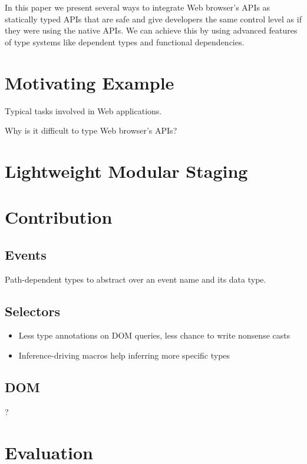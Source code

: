 \documentclass[runningheads,a4paper]{llncs}
\begin{document}
In this paper we present several ways to integrate Web browser’s APIs as statically typed APIs that are safe and
give developers the same control level as if they were using the native APIs. We can achieve this by using advanced
features of type systems like dependent types and functional dependencies.

\section{Motivating Example}

Typical tasks involved in Web applications.

Why is it difficult to type Web browser’s APIs?

\section{Lightweight Modular Staging}

\section{Contribution}

\subsection{Events}

Path-dependent types to abstract over an event name and its data type.

\subsection{Selectors}

\begin{itemize}
 \item Less type annotations on DOM queries, less chance to write nonsense casts
 \item Inference-driving macros help inferring more specific types
\end{itemize}

\subsection{DOM}

?

\section{Evaluation}
\end{document}
